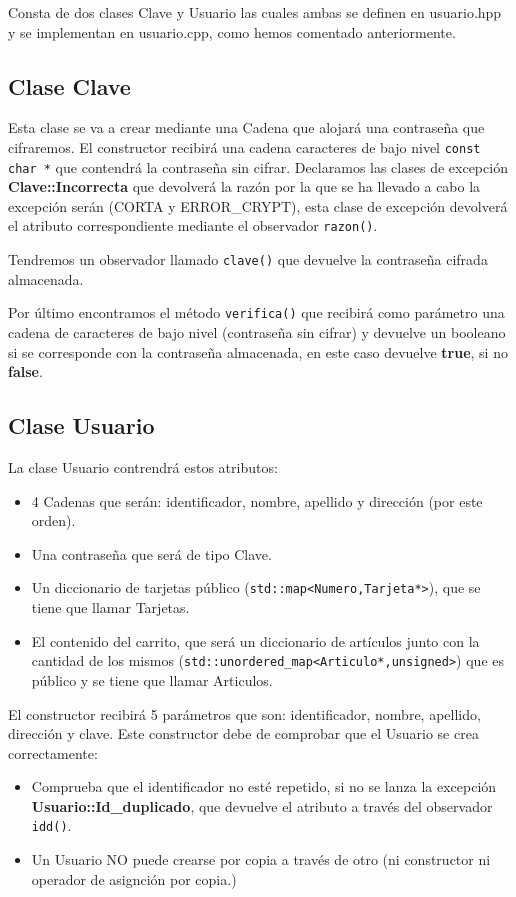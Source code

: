 Consta de dos clases Clave y Usuario las cuales ambas se 
definen en usuario.hpp y se implementan en usuario.cpp, como hemos 
comentado anteriormente.
\subsection{Clase Clave}
Esta clase se va a crear mediante una Cadena que alojará una contraseña que cifraremos.
El constructor recibirá una cadena caracteres de bajo nivel \texttt{const char *} que contendrá la contraseña sin cifrar.
Declaramos las clases de excepción \textbf{Clave::Incorrecta} que devolverá la razón por la que se ha llevado a cabo la excepción serán (CORTA y ERROR\_CRYPT), esta clase de excepción devolverá el atributo correspondiente mediante el observador \texttt{razon()}.

Tendremos un observador llamado \texttt{clave()} que devuelve la contraseña cifrada almacenada.

Por último encontramos el método \texttt{verifica()} que recibirá como parámetro una cadena de caracteres de bajo nivel (contraseña sin cifrar) y devuelve un booleano si se corresponde con la contraseña almacenada, en este caso devuelve \textbf{true}, si no \textbf{false}.

\subsection{Clase Usuario}
La clase Usuario contrendrá estos atributos:
\begin{itemize}
    \item 4 Cadenas que serán: identificador, nombre, apellido y dirección (por este orden).
    \item Una contraseña que será de tipo Clave.
    \item Un diccionario de tarjetas público (\texttt{std::map<Numero,Tarjeta*>}), que se tiene que llamar Tarjetas.
    \item El contenido del carrito, que será un diccionario de artículos junto con la cantidad de los mismos (\texttt{std::unordered\_map<Articulo*,unsigned>}) que es público y se tiene que llamar Articulos.
\end{itemize}

El constructor recibirá 5 parámetros que son: identificador, nombre, apellido, dirección y clave.
Este constructor debe de comprobar que el Usuario se crea correctamente:
\begin{itemize}
    \item Comprueba que el identificador no esté repetido, si no se lanza la excepción \textbf{Usuario::Id\_duplicado}, que devuelve el atributo a través del observador \texttt{idd()}.
    \item Un Usuario NO puede crearse por copia a través de otro (ni constructor ni operador de asignción por copia.)
\end{itemize}


